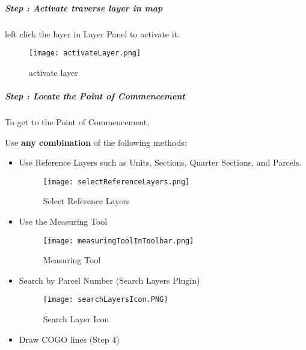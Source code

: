 
\subparagraph*{{\LARGE Step \thestepCount:} Activate traverse layer in map}
\vspace{.2in}

\vspace{.2in}

 left click the layer \textbf {} in Layer Panel to activate it.
\vspace{.2in}

\begin{figure}[H] %
\centering
    \texttt{[image: activateLayer.png]}
\vspace{-.1in}

\caption{activate layer}
\end{figure}

\clearpage


\subparagraph*{{\LARGE Step \thestepCount:} Locate the Point of Commencement}
\vspace{.2in}

\noindent To get to the Point of Commencement,
\vspace{.2in}

\noindent Use \textbf{any combination} of the following methods:
\vspace{.2in}

\begin{itemize}
\item{Use Reference Layers such as Units, Sections, Quarter Sections, and Parcels.

  \begin{figure}[H]
  \centering
  \texttt{[image: selectReferenceLayers.png]}
  \vspace{-.1in}

  \caption{Select Reference Layers}
  \end{figure}
}
\clearpage

\item{Use the Measuring Tool

  \begin{figure}[H]
  \centering
      \texttt{[image: measuringToolInToolbar.png]}
  \vspace{-.2in}

  \caption{Measuring Tool}
  \end{figure}
}
\vspace{.3in}

\item{Search by Parcel Number \small(Search Layers Plugin)\\
\begin{figure}[H]
\centering
    \texttt{[image: searchLayersIcon.PNG]}
\caption{Search Layer Icon}
\end{figure}
}
\item{Draw COGO lines \small(Step 4)}
\end{itemize}
\clearpage

